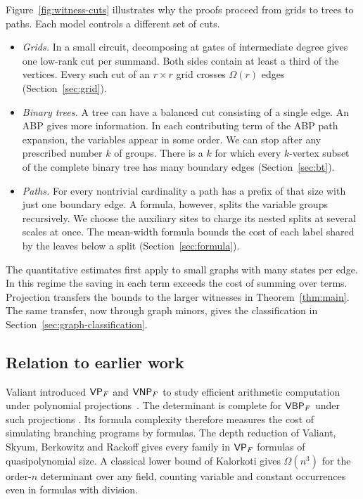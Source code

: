 Figure~\ref{fig:witness-cuts} illustrates why the proofs proceed from
grids to trees to paths. Each model controls a different set of cuts.
\begin{itemize}[leftmargin=*,itemsep=.35ex]
\item \emph{Grids.} In a small circuit, decomposing at gates of
intermediate degree gives one low-rank cut per summand. Both sides
contain at least a third of the vertices. Every such cut of an
\(r\times r\) grid crosses \(\Omega(r)\) edges
(Section~\ref{sec:grid}).
\item \emph{Binary trees.} A tree can have a balanced cut consisting of
a single edge. An ABP gives more information. In each contributing term of the ABP path expansion, the variables
appear in some order. We can stop after any prescribed number \(k\) of
groups. There is a \(k\) for which
every \(k\)-vertex subset of the complete binary tree has many
boundary edges (Section~\ref{sec:bt}).
\item \emph{Paths.} For every nontrivial cardinality a path has a
prefix of that size with just one boundary edge. A formula, however,
splits the variable groups recursively. We choose the auxiliary
sites to charge its nested splits at several scales at once. The
mean-width formula bounds the cost of each label shared by the
leaves below a split (Section~\ref{sec:formula}).
\end{itemize}

The quantitative estimates first apply to small graphs with many states
per edge. In this regime the saving in each term exceeds the cost of
summing over terms. Projection transfers the bounds to the larger
witnesses in Theorem~\ref{thm:main}. The same transfer, now through
graph minors, gives the classification in
Section~\ref{sec:graph-classification}.

\subsection*{Relation to earlier work}

Valiant introduced $\mathsf{VP}_F$ and $\mathsf{VNP}_F$ to study efficient arithmetic
computation under polynomial projections~\cite{Valiant,Burgisser}.
The determinant is complete for $\mathsf{VBP}_F$ under such projections
\cite{Toda,MalodPortier,MahajanVinay}. Its formula complexity therefore
measures the cost of simulating branching programs by formulas.
The depth reduction of Valiant, Skyum, Berkowitz and Rackoff
\cite{VSBR} gives every family in $\mathsf{VP}_F$ formulas of
quasipolynomial size. A classical lower bound of Kalorkoti
\cite{Kalorkoti} gives $\Omega(n^3)$ for the order-$n$ determinant over
any field, counting variable and constant occurrences even in formulas
with division.

